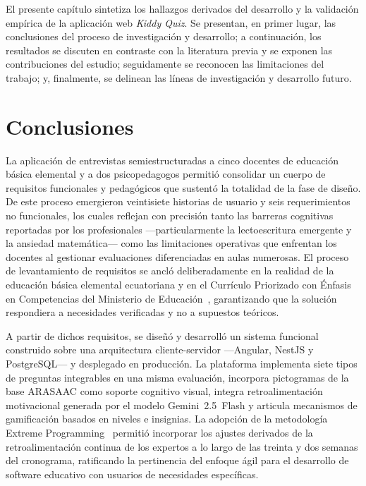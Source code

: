 
\noindent
El presente capítulo sintetiza los hallazgos derivados del desarrollo y la
validación empírica de la aplicación web \textit{Kiddy Quiz}. Se presentan,
en primer lugar, las conclusiones del proceso de investigación y desarrollo;
a continuación, los resultados se discuten en contraste con la literatura
previa y se exponen las contribuciones del estudio; seguidamente se reconocen
las limitaciones del trabajo; y, finalmente, se delinean las líneas de
investigación y desarrollo futuro.

\section{Conclusiones}
\label{sec:conclusiones}

La aplicación de entrevistas semiestructuradas a cinco docentes de educación
básica elemental y a dos psicopedagogos permitió consolidar un cuerpo de
requisitos funcionales y pedagógicos que sustentó la totalidad de la fase de
diseño. De este proceso emergieron veintisiete historias de usuario y seis
requerimientos no funcionales, los cuales reflejan con precisión tanto las
barreras cognitivas reportadas por los profesionales ---particularmente la
lectoescritura emergente y la ansiedad matemática--- como las limitaciones
operativas que enfrentan los docentes al gestionar evaluaciones diferenciadas
en aulas numerosas. El proceso de levantamiento de requisitos se ancló
deliberadamente en la realidad de la educación básica elemental ecuatoriana y
en el Currículo Priorizado con Énfasis en Competencias del Ministerio de
Educación~\cite{mineduc2021curriculo}, garantizando que la solución respondiera
a necesidades verificadas y no a supuestos teóricos.

A partir de dichos requisitos, se diseñó y desarrolló un sistema funcional
construido sobre una arquitectura cliente-servidor ---Angular, NestJS y
PostgreSQL--- y desplegado en producción. La plataforma implementa siete tipos
de preguntas integrables en una misma evaluación, incorpora pictogramas de la
base ARASAAC como soporte cognitivo visual, integra retroalimentación
motivacional generada por el modelo Gemini~2.5~Flash y articula mecanismos de
gamificación basados en niveles e insignias. La adopción de la metodología
Extreme Programming~\cite{beck2004xp,dyba2008agile} permitió incorporar los
ajustes derivados de la retroalimentación continua de los expertos a lo largo
de las treinta y dos semanas del cronograma, ratificando la pertinencia del
enfoque ágil para el desarrollo de software educativo con usuarios de
necesidades específicas.

